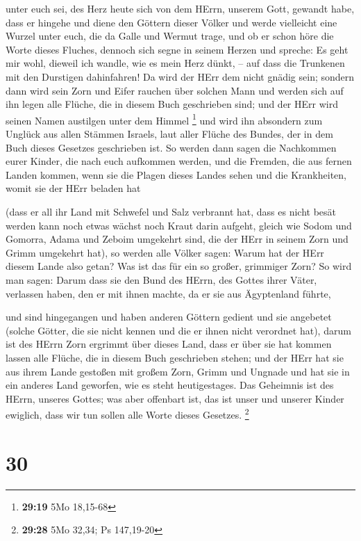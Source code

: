 unter euch sei, des Herz heute sich von dem HErrn, unserem Gott, gewandt
habe, dass er hingehe und diene den Göttern dieser Völker und werde
vielleicht eine Wurzel unter euch, die da Galle und Wermut trage,
 und ob er schon höre die Worte dieses Fluches, dennoch
sich segne in seinem Herzen und spreche: Es geht mir wohl, dieweil ich
wandle, wie es mein Herz dünkt, -- auf dass die Trunkenen mit den
Durstigen dahinfahren!  Da wird der HErr dem nicht gnädig
sein; sondern dann wird sein Zorn und Eifer rauchen über solchen Mann
und werden sich auf ihn legen alle Flüche, die in diesem Buch
geschrieben sind; und der HErr wird seinen Namen austilgen unter dem
Himmel \footnote{\textbf{29:19} 5Mo 18,15-68}  und wird ihn
absondern zum Unglück aus allen Stämmen Israels, laut aller Flüche des
Bundes, der in dem Buch dieses Gesetzes geschrieben ist. 
So werden dann sagen die Nachkommen eurer Kinder, die nach euch
aufkommen werden, und die Fremden, die aus fernen Landen kommen, wenn
sie die Plagen dieses Landes sehen und die Krankheiten, womit sie der
HErr beladen hat

 (dass er all ihr Land mit Schwefel und Salz verbrannt hat,
dass es nicht besät werden kann noch etwas wächst noch Kraut darin
aufgeht, gleich wie Sodom und Gomorra, Adama und Zeboim umgekehrt sind,
die der HErr in seinem Zorn und Grimm umgekehrt hat),  so
werden alle Völker sagen: Warum hat der HErr diesem Lande also getan?
Was ist das für ein so großer, grimmiger Zorn?  So wird man
sagen: Darum dass sie den Bund des HErrn, des Gottes ihrer Väter,
verlassen haben, den er mit ihnen machte, da er sie aus Ägyptenland
führte,

 und sind hingegangen und haben anderen Göttern gedient und
sie angebetet (solche Götter, die sie nicht kennen und die er ihnen
nicht verordnet hat),  darum ist des HErrn Zorn ergrimmt
über dieses Land, dass er über sie hat kommen lassen alle Flüche, die in
diesem Buch geschrieben stehen;  und der HErr hat sie aus
ihrem Lande gestoßen mit großem Zorn, Grimm und Ungnade und hat sie in
ein anderes Land geworfen, wie es steht heutigestages.  Das
Geheimnis ist des HErrn, unseres Gottes; was aber offenbart ist, das ist
unser und unserer Kinder ewiglich, dass wir tun sollen alle Worte dieses
Gesetzes. \footnote{\textbf{29:28} 5Mo 32,34; Ps 147,19-20}

\hypertarget{section-9}{%
\section{30}\label{section-9}}

